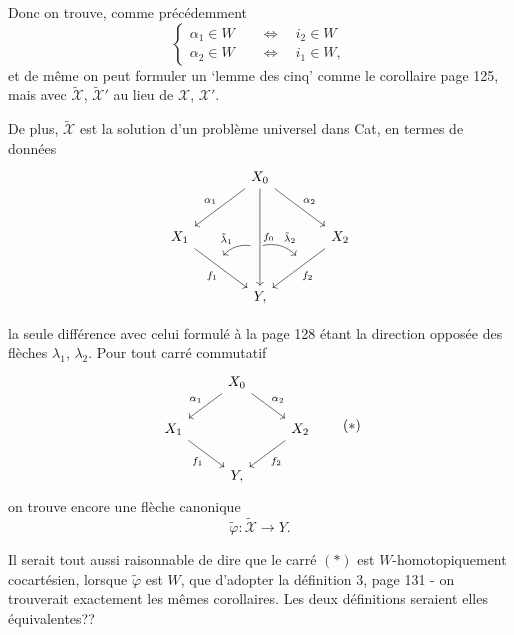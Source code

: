 \documentclass[11pt]{article}
\newcommand{\printedpage}[1]{\marginpar{\footnotesize p.~#1}}
\newcommand{\msp}[1]{\marginpar{\footnotesize [#1]}}
\newcommand{\sX}{\mathscr{X}}
\newcommand{\tX}{\tilde{\mathscr{X}}}
\begin{document}
Donc on trouve, comme précédemment
\[
\left\{
\begin{aligned}
\alpha_1 \in W &\quad\iff\quad i_2 \in W \\
\alpha_2 \in W &\quad\iff\quad i_1 \in W,
\end{aligned}
\right.
\]
et de même on peut formuler un ‘lemme des cinq’ comme le corollaire page 125, mais avec $\tX$, $\tX'$ au lieu de $\sX$, $\sX'$.

De plus, $\tX$ est la solution d'un problème universel dans Cat, en termes de données
\[
\begin{tikzcd}[row sep=large, column sep=large]
 & X_0 \arrow[dl, "\alpha_1"'] \arrow[dr, "\alpha_2"] \arrow[dd, "f_0", ""'{name=G0, pos=0.6}] & \\
X_1 \arrow[dr, "f_1"', ""{name=G1, pos=0.4}] & & X_2 \arrow[dl, "f_2", ""'{name=G2, pos=0.4}] \\
 & Y, &
\arrow[from=G0, to=G1, bend right, "\tilde{\lambda}_1"', shorten <=2pt, shorten >=2pt]
\arrow[from=G0, to=G2, bend left, "\tilde{\lambda}_2", shorten <=2pt, shorten >=2pt]
\end{tikzcd}
\]

\msp{page 136}
la seule différence avec celui formulé à la page 128 étant la direction opposée des flèches $\lambda_1$, $\lambda_2$. Pour tout carré commutatif
\[
\begin{tikzcd}
 & X_0 \arrow[dl, "\alpha_1"'] \arrow[dr, "\alpha_2"] & \\
X_1 \arrow[dr, "f_1"'] & & X_2 \arrow[dl, "f_2"] \\
 & Y, &
\end{tikzcd}
\tag*{$(*)$}
\]
on trouve encore une flèche canonique
\[
\tilde{\varphi} : \tX \longrightarrow Y.
\]

Il serait tout aussi raisonnable de dire que le carré $(*)$ est $W$-homotopiquement cocartésien, lorsque $\tilde{\varphi}$ est $W$, que d'adopter la définition 3, page 131 - on trouverait exactement les mêmes corollaires. Les deux définitions seraient elles équivalentes?? %

\printedpage{93}
\end{document}
